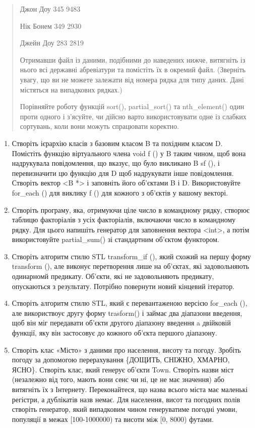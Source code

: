 \documentclass[]{article}
\begin{document}
\begin{quote}
Джон Доу 345 9483

Нік Бонем 349 2930

Джейн Доу 283 2819

Отримавши файл із даними, подібними до наведених нижче, витягніть із
нього всі державні абревіатури та помістіть їх в окремий файл. (Зверніть
увагу, що ви не можете залежати від номера рядка для типу даних. Дані
містяться на випадкових рядках.)

Порівняйте роботу функцій sort(), partial\_sort() та nth\_element() один
проти одного і з'ясуйте, чи дійсно варто використовувати одне із слабких
сортувань, коли вони можуть спрацювати коректно.
\end{quote}

\begin{enumerate}
\def\labelenumi{\arabic{enumi}.}
\item
  Створіть ієрархію класів з базовим класом B та похідним класом D.
  Помістіть функцію віртуального члена void f () у B таким чином, щоб
  вона надрукувала повідомлення, що вказує, що було викликано B sf (), і
  перевизначити цю функцію для D щоб надрукувати інше повідомлення.
  Створіть вектор \textless{}B *\textgreater{} і заповніть його
  об'єктами B і D. Використовуйте for\_each () для виклику f () для
  кожного з об'єктів у вашому векторі.
\item
  Створіть програму, яка, отримуючи ціле число в командному рядку,
  створює таблицю факторіалів з усіх факторіалів, включаючи число в
  командному рядку. Для цього напишіть генератор для заповнення вектора
  \textless{}int\textgreater{}, а потім використовуйте partial\_sum() зі
  стандартним об'єктом функтором.
\item
  Створіть алгоритм стилю STL transform\_if (), який схожий на першу
  форму transform (), але виконує перетворення лише на об'єктах, які
  задовольняють одинарномй предикату. Об'єкти, які не задовольняють
  предикату, опускаються з результату. Потрібно повернути новий кінцевий
  ітератор.
\item
  Створіть алгоритм стилю STL, який є перевантаженою версією for\_each
  (), але використвоує другу форму trasform() і займає два діапазони
  введення, щоб він міг передавати об'єкти другого діапазону введення a
  двійковій функції, яку він застосовує до кожного об'єкта першого
  діапазону.
\item
  Створіть клас «Місто» з даними про населення, висоту та погоду.
  Зробіть погоду за допомогою перерахування \{ДОЩИТЬ, СНІЖНО, ХМАРНО,
  ЯСНО\}. Створіть клас, який генерує об'єкти Town. Створіть назви міст
  (незалежно від того, мають вони сенс чи ні, це не має значення) або
  витягніть їх з Інтернету. Переконайтеся, що назва всього міста має
  маленькі регістри, а дублікатів назв немає. Для населення, висот та
  погодних полів створіть генератор, який випадковим чином генеруватиме
  погодні умови, популяції в межах {[}100-1000000) та висоти між {[}0,
  8000) футами.


\end{enumerate}
\end{document}
